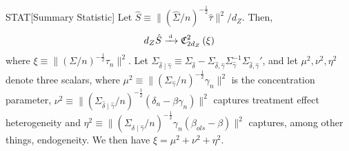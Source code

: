 \begin{lemmap}{STAT}[Summary Statistic]\label{lem:stat}
Let \(\hat S \equiv \lVert (\hat\Sigma/n)^{-\frac{1}{2}}\hat \tau\rVert^2/d_Z\).
Then,
\begin{align*}
    d_Z\hat S  \xrightarrow{{\scriptscriptstyle \mathrm{\;d\;}}} \mathfrak{C}^2_{2d_Z}\left(\xi\right)
\end{align*}
where \(\xi \equiv \lVert (\Sigma/n)^{-\frac{1}{2}}\tau_n\rVert^2\).
Let  \( \Sigma_{\hat\delta \mid \hat\gamma} \equiv  \Sigma_{\hat \delta} - \Sigma_{\hat \delta,\hat \gamma} \Sigma_{\hat \gamma}^{-1}\Sigma_{\hat \delta,\hat \gamma}' \), and let \(\mu^2, \nu^2, \eta^2\) denote three scalars, where \(\mu^2\equiv \lVert  (\Sigma_{\hat \gamma}/n)^{-\frac{1}{2}}\gamma_n\rVert^2\) is the concentration parameter, \(\nu^2 \equiv \lVert (\Sigma_{\hat\delta \mid \hat\gamma}/n)^{-\frac{1}{2}} (\delta_n-\beta\gamma_n)\rVert^2\) captures treatment effect heterogeneity and \(\eta^2 \equiv\lVert (\Sigma_{\hat\delta \mid \hat\gamma}/n)^{-\frac{1}{2}}\gamma_n(\beta_{ols}-\beta)\rVert^2\) captures, among other things, endogeneity. We then have \(\xi = \mu^2 + \nu^2 + \eta^2\).
\end{lemmap}
